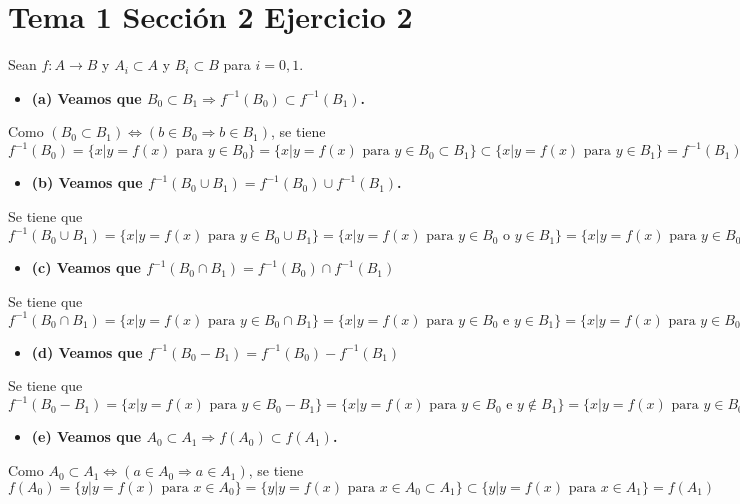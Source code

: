 \documentclass{article}
\begin{document}
\section{Tema 1 Sección 2 Ejercicio 2}
Sean $f:A\rightarrow B$ y $A_i\subset A$ y $B_i\subset B$ para $i=0,1$.
\begin{itemize}
\item \bf (a) \rm Veamos que $B_0\subset B_1\Rightarrow f^{-1}(B_0)\subset f^{-1}(B_1)$.
\end{itemize}
Como $(B_0\subset B_1)\Leftrightarrow (b\in B_0\Rightarrow b\in B_1)$, se tiene $f^{-1}(B_0)=\{x|y=f(x) \text{ para }y\in B_0\}=\{x|y=f(x) \text{ para }y\in B_0\subset B_1\}\subset \{x|y=f(x) \text{ para }y\in B_1\}=f^{-1}(B_1)$
\begin{itemize}
\item \bf (b) \rm Veamos que $f^{-1}(B_0\cup B_1)= f^{-1}(B_0)\cup f^{-1}(B_1)$.
\end{itemize}
Se tiene que $f^{-1}(B_0\cup B_1)=\{x|y=f(x) \text{ para }y\in B_0\cup B_1\}=\{x|y=f(x) \text{ para }y\in B_0\text{ o } y\in B_1\}=\{x|y=f(x) \text{ para }y\in B_0\}\cup \{x|y=f(x) \text{ para }y\in B_1\}=f^{-1}(B_0)\cup f^{-1}(B_1)$
\begin{itemize}
\item \bf (c) \rm Veamos que $f^{-1}(B_0\cap B_1)= f^{-1}(B_0)\cap f^{-1}(B_1)$
\end{itemize}
Se tiene que $f^{-1}(B_0\cap B_1)=\{x|y=f(x) \text{ para }y\in B_0\cap B_1\}=\{x|y=f(x) \text{ para }y\in B_0\text{ e } y\in B_1\}=\{x|y=f(x) \text{ para }y\in B_0\}\cap \{x|y=f(x) \text{ para }y\in B_1\}=f^{-1}(B_0)\cap f^{-1}(B_1)$
\begin{itemize}
\item \bf (d) \rm Veamos que $f^{-1}(B_0- B_1)= f^{-1}(B_0)- f^{-1}(B_1)$
\end{itemize}
Se tiene que $f^{-1}(B_0-B_1)=\{x|y=f(x) \text{ para }y\in B_0-B_1\}=\{x|y=f(x) \text{ para }y\in B_0\text{ e } y\notin B_1\}=\{x|y=f(x) \text{ para }y\in B_0\}\cap\{x|y=f(x) \text{ para }y\notin B_1\}=\{x|y=f(x) \text{ para }y\in B_0\}\cap\{x|y=f(x) \text{ para }y\notin B_1\}=\{x|y=f(x) \text{ para }y\in B_0\}-\{x|y=f(x) \text{ para }y\in B_1\}=f^{-1}(B_0)- f^{-1}(B_1)$
\begin{itemize}
\item \bf (e) \rm Veamos que $A_0\subset A_1\Rightarrow f(A_0)\subset f(A_1)$.
\end{itemize}
Como $A_0\subset A_1\Leftrightarrow (a\in A_0\Rightarrow a\in A_1)$, se tiene $f(A_0)=\{y|y=f(x) \text{ para }x\in A_0\}=\{y|y=f(x) \text{ para }x\in A_0\subset A_1\}\subset \{y|y=f(x) \text{ para }x\in A_1\}=f(A_1)$
\end{document}
